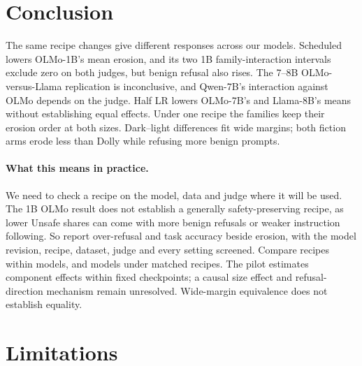 \documentclass[11pt]{article}
\begin{document}
\section{Conclusion}
\label{sec:conclusion}

The same recipe changes give different responses across our models. Scheduled
lowers OLMo-1B's mean erosion, and its two 1B family-interaction intervals
exclude zero on both judges, but benign refusal also rises. The 7--8B
OLMo-versus-Llama replication is inconclusive, and Qwen-7B's interaction
against OLMo depends on the judge. Half LR lowers OLMo-7B's and Llama-8B's
means without establishing equal effects. Under one recipe the families keep
their erosion order at both sizes. Dark--light differences fit wide margins;
both fiction arms erode less than Dolly while refusing more benign prompts.

\paragraph{What this means in practice.} We need to check a recipe on the
model, data and judge where it will be used. The 1B OLMo result does not
establish a generally safety-preserving recipe, as lower Unsafe shares can
come with more benign refusals or weaker instruction following. So report
over-refusal and task accuracy beside erosion, with the model revision,
recipe, dataset, judge and every setting screened. Compare recipes within
models, and models under matched recipes. The pilot estimates component
effects within fixed checkpoints; a causal size effect and refusal-direction
mechanism remain unresolved. Wide-margin equivalence does not establish equality.

\clearpage
\section*{Limitations}
\end{document}
